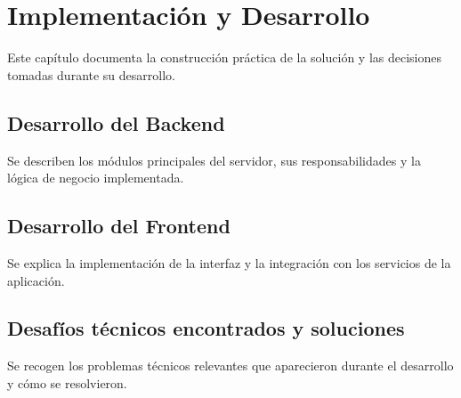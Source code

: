 \chapter{Implementación y Desarrollo}
\label{cap:implementacion}

Este capítulo documenta la construcción práctica de la solución y las decisiones tomadas durante su desarrollo.

\section{Desarrollo del Backend}

Se describen los módulos principales del servidor, sus responsabilidades y la lógica de negocio implementada.

\section{Desarrollo del Frontend}

Se explica la implementación de la interfaz y la integración con los servicios de la aplicación.

\section{Desafíos técnicos encontrados y soluciones}

Se recogen los problemas técnicos relevantes que aparecieron durante el desarrollo y cómo se resolvieron.